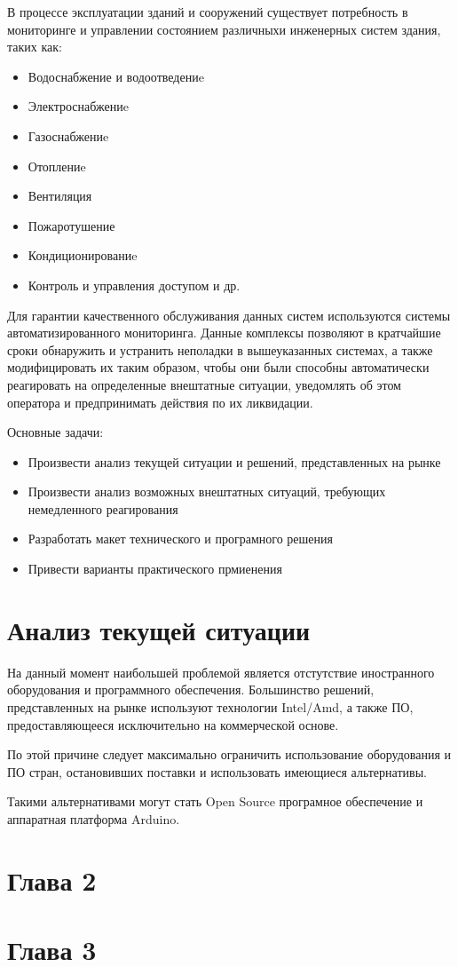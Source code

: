 \newpage
{}
В процессе эксплуатации зданий и сооружений существует потребность в мониторинге и управлении состоянием различныхи инженерных систем здания, таких как:

\begin{itemize}
	\itemsep0em 
	\item Водоснабжение и водоотведениe
	\item Электроснабжениe
	\item Газоснабжениe
	\item Отоплениe
	\item Вентиляция
	\item Пожаротушение
	\item Кондиционированиe
	\item Контроль и управления доступом и др.
\end{itemize}

Для гарантии качественного обслуживания данных систем используются системы автоматизированного мониторинга. Данные комплексы позволяют в кратчайшие сроки обнаружить и устранить неполадки в вышеуказанных системах, а также модифицировать их таким образом, чтобы они были способны автоматически реагировать на определенные внештатные ситуации, уведомлять об этом оператора и предпринимать действия по их ликвидации.

Основные задачи:
\begin{itemize}
	\itemsep0em 
	\item Произвести анализ текущей ситуации и решений, представленных на рынке
	\item Произвести анализ возможных внештатных ситуаций, требующих немедленного реагирования
	\item Разработать макет технического и програмного решения
	\item Привести варианты практического прмиенения 
\end{itemize}


\newpage\section{Анализ текущей ситуации}

На данный момент наибольшей проблемой является отстутствие иностранного оборудования и программного обеспечения. Большинство решений, представленных на рынке используют технологии Intel/Amd, а также ПО, предоставляющееся исключительно на коммерческой основе.

По этой причине следует максимально ограничить использование оборудования и ПО стран, остановивших поставки и использовать имеющиеся альтернативы.

Такими альтернативами могут стать Open Source програмное обеспечение и аппаратная платформа Arduino.

\newpage\section{Глава 2}

\newpage\section{Глава 3}

\newpage{}